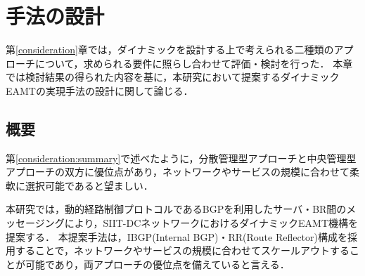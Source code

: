 \chapter{手法の設計}
\label{proposal}
第\ref{consideration}章では，ダイナミックを設計する上で考えられる二種類のアプローチについて，求められる要件に照らし合わせて評価・検討を行った．
本章では検討結果の得られた内容を基に，本研究において提案するダイナミックEAMTの実現手法の設計に関して論じる．

\section{概要}
第\ref{consideration:summary}で述べたように，分散管理型アプローチと中央管理型アプローチの双方に優位点があり，ネットワークやサービスの規模に合わせて柔軟に選択可能であると望ましい．

本研究では，動的経路制御プロトコルであるBGPを利用したサーバ・BR間のメッセージングにより，SIIT-DCネットワークにおけるダイナミックEAMT機構を提案する．
本提案手法は，IBGP(Internal BGP)・RR(Route Reflector)構成を採用することで，ネットワークやサービスの規模に合わせてスケールアウトすることが可能であり，両アプローチの優位点を備えていると言える．







